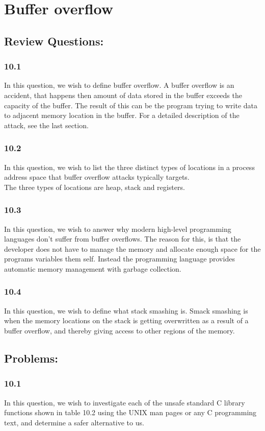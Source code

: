 \documentclass{article}
\begin{document}
\section{Buffer overflow}
\subsection{Review Questions:}
\subsubsection{10.1}
In this question, we wish to define buffer overflow. A buffer overflow is an accident, that happens then amount of data stored in the buffer exceeds the capacity of the buffer. The result of this can be the program trying to write data to adjacent memory location in the buffer. For a detailed description of the attack, see the last section.

\subsubsection{10.2}
In this question, we wish to list the three distinct types of locations in a process address space that buffer overflow attacks typically targets.\\ 
The three types of locations are heap, stack and registers. 
\subsubsection{10.3}
In this question, we wish to answer why modern high-level programming languages don't suffer from buffer overflows. The reason for this, is that the developer does not have to manage the memory and allocate enough space for the programs variables them self. Instead the programming language provides automatic memory management with garbage collection. 

\subsubsection{10.4}
In this question, we wish to define what stack smashing is. Smack smashing is when the memory locations on the stack is getting overwritten as a result of a buffer overflow, and thereby giving access to other regions of the memory. 

\subsection{Problems:}
\subsubsection{10.1}
In this question, we wish to investigate each of the unsafe standard C library functions shown in table 10.2 using the UNIX man pages or any C programming text, and determine a safer alternative to us. \\ 
\end{document}
